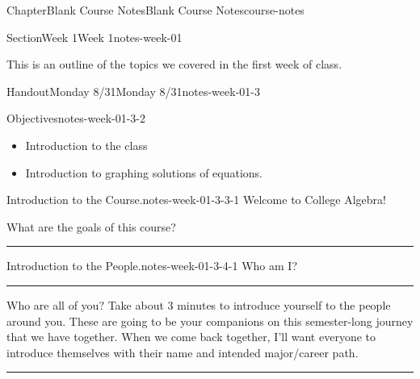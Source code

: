 \documentclass[twoside,14pt,]{extbook}
\newcommand{\ptxlistdisc}{\raisebox{0.3ex}{\textbullet}}
\newlength{\ptxworkspacestrutwidth}
\begin{document}
\typeout{************************************************}
%
\begin{chapterptx}{Chapter}{Blank Course Notes}{}{Blank Course Notes}{}{}{course-notes}
\renewcommand*{\chaptername}{Chapter}
%
%
\typeout{************************************************}
\typeout{************************************************}
%
\begin{sectionptx}{Section}{Week 1}{}{Week 1}{}{}{notes-week-01}
\begin{introduction}{}%
This is an outline of the topics we covered in the first week of class.%
\end{introduction}%
%
%
\typeout{************************************************}
\typeout{************************************************}
%
\begin{handout-subsection}{Handout}{Monday 8\slash{}31}{}{Monday 8\slash{}31}{}{}{notes-week-01-3}
\begin{objectives}{Objectives}{notes-week-01-3-2}
%
\begin{itemize}[label=\ptxlistdisc]
\item{}Introduction to the class%
\item{}Introduction to graphing solutions of equations.%
\end{itemize}
\end{objectives}
\begin{paragraphs}{Introduction to the Course.}{notes-week-01-3-3-1}%
Welcome to College Algebra!%
\par
What are the goals of this course?%
\par
%
\par\rule{\ptxworkspacestrutwidth}{4in}%
\end{paragraphs}%
\clearpage
\begin{paragraphs}{Introduction to the People.}{notes-week-01-3-4-1}%
Who am I?%
\par\rule{\ptxworkspacestrutwidth}{3in}%
\par
Who are all of you? Take about 3 minutes to introduce yourself to the people around you. These are going to be your companions on this semester-long journey that we have together. When we come back together, I'll want everyone to introduce themselves with their name and intended major\slash{}career path.%
\par\rule{\ptxworkspacestrutwidth}{1in}%
\end{paragraphs}%

\end{handout-subsection}
\end{sectionptx}
\end{chapterptx}
\end{document}
